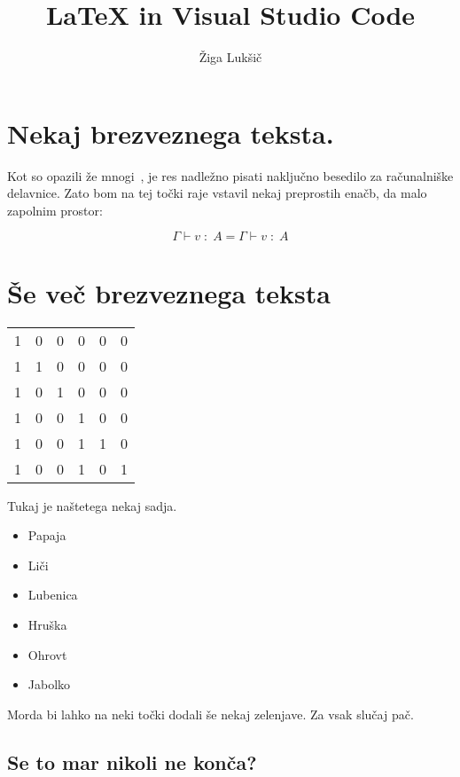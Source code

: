 \documentclass{article}
\title{LaTeX in Visual Studio Code}
\author{Žiga Lukšič}
\newcommand{\todo}[1]{{\color{red}{#1}}}
\newcommand{\ctx}{\Gamma}
\newcommand{\oftype}{\;:\;}
\newcommand{\tyA}{A}
\newcommand{\judgement}[3][\ctx]{#1 \vdash #2 \oftype #3}
\begin{document}
\maketitle

\section{Nekaj brezveznega teksta.}

Kot so opazili že mnogi~\cite{DBLP:journals/entcs/Pretnar15,DBLP:journals/jlp/BauerP15}, je res nadležno pisati naključno besedilo za računalniške delavnice. Zato bom na tej točki raje vstavil nekaj preprostih enačb, da malo zapolnim prostor:

\[
  \judgement{v}{\tyA} = \judgement[\ctx]{v}{\tyA}
\]

\section{Še več brezveznega teksta}

\begin{tabular}{c|c|c|c|c|c}
  1 & 0 & 0 & 0 & 0 & 0 \\
  1 & 1 & 0 & 0 & 0 & 0 \\
  1 & 0 & 1 & 0 & 0 & 0 \\
  1 & 0 & 0 & 1 & 0 & 0 \\
  1 & 0 & 0 & 1 & 1 & 0 \\
  1 & 0 & 0 & 1 & 0 & 1 \\
\end{tabular}

Tukaj je naštetega nekaj sadja.

\begin{itemize}
  \item Papaja
  \item Liči
  \item Lubenica
  \item Hruška
  \item Ohrovt \todo{(???)}
  \item Jabolko
\end{itemize}

Morda bi lahko na neki točki dodali še nekaj zelenjave. Za vsak slučaj pač.

\newpage

\subsection{Se to mar nikoli ne konča?}
\end{document}
